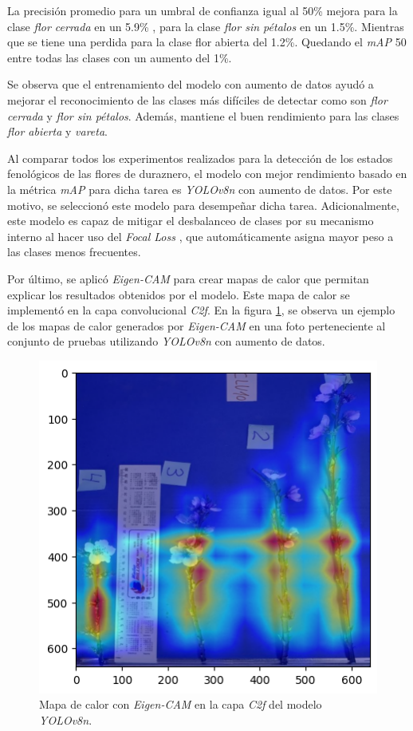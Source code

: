 La precisión promedio para un umbral de confianza igual al 50\% mejora para la clase \textit{flor cerrada} en un 5.9\% , para la clase \textit{flor sin pétalos} en un 1.5\%. Mientras que se tiene una perdida para la clase flor abierta del 1.2\%. Quedando el \textit{mAP} 50 entre todas las clases con un aumento del 1\%.

Se observa que el entrenamiento del modelo con aumento de datos ayudó a mejorar el reconocimiento de las clases más difíciles de detectar como son \textit{flor cerrada} y \textit{flor sin pétalos}. Además, mantiene el buen rendimiento para las clases \textit{flor abierta} y \textit{vareta}.

Al comparar todos los experimentos realizados para la detección de los estados fenológicos de las flores de duraznero, el modelo con mejor rendimiento basado en la métrica \textit{mAP} para dicha tarea es \textit{YOLOv8n} con aumento de datos. Por este motivo, se seleccionó este modelo para desempeñar dicha tarea. Adicionalmente, este modelo es capaz de mitigar el desbalanceo de clases por su mecanismo interno al hacer uso del \textit{Focal Loss} \cite{ARTICLE:15}, que automáticamente asigna mayor peso a las clases menos frecuentes. 

Por último, se aplicó \textit{Eigen-CAM} \cite{ARTICLE:17} para crear mapas de calor que permitan explicar los resultados obtenidos por el modelo. Este mapa de calor se implementó en la capa convolucional \textit{C2f}. En la figura \ref{fig:EigenCam}, se observa un ejemplo de los mapas de calor generados por \textit{Eigen-CAM} en una foto perteneciente al conjunto de pruebas utilizando \textit{YOLOv8n} con aumento de datos.

\begin{figure}[ht]
	\centering
	\includegraphics[scale=0.55]{./Figures/EigenCamEj.png}
	\caption{Mapa de calor con \textit{Eigen-CAM} en la capa \textit{C2f} del modelo \textit{YOLOv8n}.}
	\label{fig:EigenCam}
\end{figure}
\newpage

